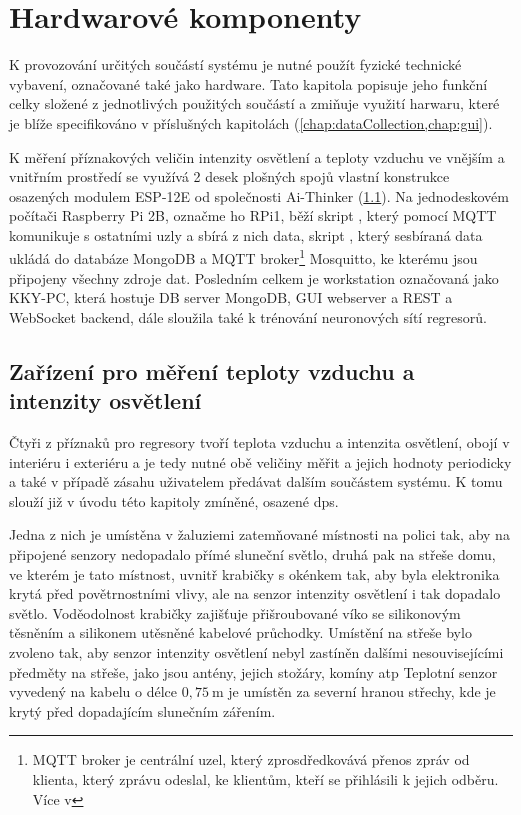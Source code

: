 \chapter{Hardwarové komponenty} \label{chap:hw}
K provozování určitých součástí systému je nutné použít fyzické technické vybavení, označované také jako hardware. Tato kapitola popisuje jeho funkční celky složené z jednotlivých použitých součástí a zmiňuje využití harwaru, které je blíže specifikováno v příslušných kapitolách (\cref{chap:dataCollection,chap:gui}).

K měření příznakových veličin intenzity osvětlení a teploty vzduchu ve vnějším a vnitřním prostředí se využívá 2 desek plošných spojů vlastní konstrukce osazených modulem ESP-12E od společnosti Ai-Thinker (\cref{sec:senzory}). Na jednodeskovém počítači Raspberry Pi 2B, označme ho RPi1, běží skript , který pomocí MQTT komunikuje s ostatními uzly a sbírá z nich data, skript , který sesbíraná data ukládá do databáze MongoDB a MQTT broker\footnote{MQTT broker je centrální uzel, který zprosdředkovává přenos zpráv od klienta, který zprávu odeslal, ke klientům, kteří se přihlásili k jejich odběru. Více v } 
Mosquitto, ke kterému jsou připojeny všechny zdroje dat. Posledním celkem je workstation označovaná jako KKY-PC, která hostuje DB server MongoDB, GUI webserver a REST a WebSocket backend, dále sloužila také k trénování neuronových sítí regresorů.

\section{Zařízení pro měření teploty vzduchu a intenzity osvětlení} \label{sec:senzory}
    Čtyři z příznaků pro regresory tvoří teplota vzduchu a intenzita osvětlení, obojí v interiéru i exteriéru a je tedy nutné obě veličiny měřit a jejich hodnoty periodicky a také v případě zásahu uživatelem předávat dalším součástem systému. K tomu slouží již v úvodu této kapitoly zmíněné, osazené \acrshort{dps}.
    
    Jedna z nich je umístěna v žaluziemi zatemňované místnosti na polici tak, aby na připojené senzory nedopadalo přímé sluneční světlo, druhá pak na střeše domu, ve kterém je tato místnost, uvnitř krabičky s okénkem tak, aby byla elektronika krytá před povětrnostními vlivy, ale na senzor intenzity osvětlení i tak dopadalo světlo. Voděodolnost krabičky zajišťuje přišroubované víko se silikonovým těsněním a silikonem utěsněné kabelové průchodky. Umístění na střeše bylo zvoleno tak, aby senzor intenzity osvětlení nebyl zastíněn dalšími nesouvisejícími předměty na střeše, jako jsou antény, jejich stožáry, komíny \acrshort{atp} Teplotní senzor vyvedený na kabelu o délce $0{,}75~\textrm{m}$ je umístěn za severní hranou střechy, kde je krytý před dopadajícím slunečním zářením.
    
